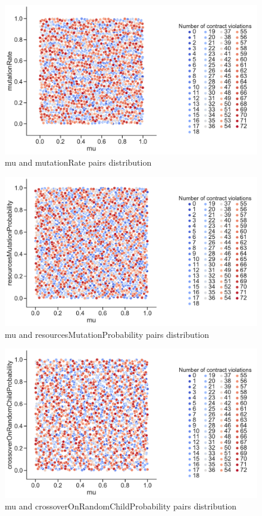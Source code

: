 \begin{figure}
	\centering
	\includegraphics[width=\textwidth]{images/PairsDistr/mu_mutationRate.pdf}
	\caption[mu and mutationRate pairs distribution]{mu and mutationRate pairs distribution}
	\label{fig:mu_mutationRate_pair}
\end{figure}
\begin{figure}
	\centering
	\includegraphics[width=\textwidth]{images/PairsDistr/mu_resourcesMutationProbability.pdf}
	\caption[mu and resourcesMutationProbability pairs distribution]{mu and resourcesMutationProbability pairs distribution}
	\label{fig:mu_resourcesMutationProbability_pair}
\end{figure}
\begin{figure}
	\centering
	\includegraphics[width=\textwidth]{images/PairsDistr/mu_crossoverOnRandomChildProbability.pdf}
	\caption[mu and crossoverOnRandomChildProbability pairs distribution]{mu and crossoverOnRandomChildProbability pairs distribution}
	\label{fig:mu_crossoverOnRandomChildProbability_pair}
\end{figure}
